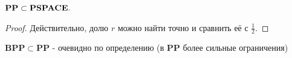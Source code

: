 \begin{statement}
    $\mathbf{PP} \subset \textbf{PSPACE}.$
\end{statement}

\begin{proof}
Действительно, долю $r$ можно найти точно и сравнить её с $\frac{1}{2}$.
\end{proof}

\begin{statement}
    $\mathbf{BPP} \subset \mathbf{PP}$ - очевидно по определению (в $\mathbf{PP}$ более сильные ограничения)
\end{statement}


